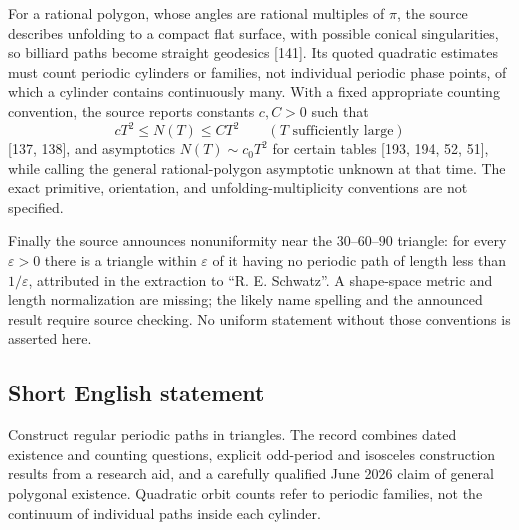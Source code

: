 \documentclass[11pt]{article}
\begin{document}
For a rational polygon, whose angles are rational multiples of $\pi$, the source describes unfolding to a compact flat surface, with possible conical singularities, so billiard paths become straight geodesics [141]. Its quoted quadratic estimates must count periodic cylinders or families, not individual periodic phase points, of which a cylinder contains continuously many. With a fixed appropriate counting convention, the source reports constants $c,C>0$ such that
\[
 cT^2\leq N(T)\leq CT^2\qquad(T\text{ sufficiently large})
\]
[137, 138], and asymptotics $N(T)\sim c_0T^2$ for certain tables [193, 194, 52, 51], while calling the general rational-polygon asymptotic unknown at that time. The exact primitive, orientation, and unfolding-multiplicity conventions are not specified.

Finally the source announces nonuniformity near the $30$--$60$--$90$ triangle: for every $\varepsilon>0$ there is a triangle within $\varepsilon$ of it having no periodic path of length less than $1/\varepsilon$, attributed in the extraction to ``R. E. Schwatz''. A shape-space metric and length normalization are missing; the likely name spelling and the announced result require source checking. No uniform statement without those conventions is asserted here.
\subsection{Short English statement}
Construct regular periodic paths in triangles. The record combines dated existence and counting questions, explicit odd-period and isosceles construction results from a research aid, and a carefully qualified June 2026 claim of general polygonal existence. Quadratic orbit counts refer to periodic families, not the continuum of individual paths inside each cylinder.
\end{document}
